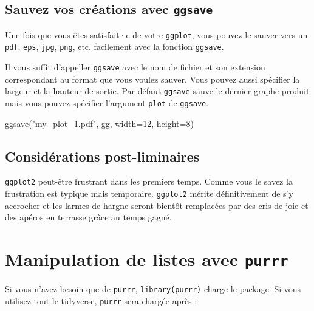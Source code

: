 \documentclass[
  letterpaper,
  DIV=11,
  numbers=noendperiod]{scrreprt}
\newenvironment{Shaded}{\begin{snugshade}}{\end{snugshade}}
\newcommand{\AttributeTok}[1]{\textcolor[rgb]{0.40,0.45,0.13}{#1}}
\newcommand{\DecValTok}[1]{\textcolor[rgb]{0.68,0.00,0.00}{#1}}
\newcommand{\FunctionTok}[1]{\textcolor[rgb]{0.28,0.35,0.67}{#1}}
\newcommand{\NormalTok}[1]{\textcolor[rgb]{0.00,0.23,0.31}{#1}}
\newcommand{\StringTok}[1]{\textcolor[rgb]{0.13,0.47,0.30}{#1}}
\begin{document}
\hypertarget{sauvez-vos-cruxe9ations-avec-ggsave}{%
\section{\texorpdfstring{Sauvez vos créations avec
\texttt{ggsave}}{Sauvez vos créations avec ggsave}}\label{sauvez-vos-cruxe9ations-avec-ggsave}}

Une fois que vous êtes satisfait·e de votre \texttt{ggplot}, vous pouvez
le sauver vers un \texttt{pdf}, \texttt{eps}, \texttt{jpg},
\texttt{png}, etc. facilement avec la fonction \texttt{ggsave}.

Il vous suffit d'appeller \texttt{ggsave} avec le nom de fichier et son
extension correspondant au format que vous voulez sauver. Vous pouvez
aussi spécifier la largeur et la hauteur de sortie. Par défaut
\texttt{ggsave} sauve le dernier graphe produit mais vous pouvez
spécifier l'argument \texttt{plot} de \texttt{ggsave}.

\begin{Shaded}
\begin{Highlighting}[]
\FunctionTok{ggsave}\NormalTok{(}\StringTok{"my\_plot\_1.pdf"}\NormalTok{, gg, }\AttributeTok{width=}\DecValTok{12}\NormalTok{, }\AttributeTok{height=}\DecValTok{8}\NormalTok{)}
\end{Highlighting}
\end{Shaded}

\hypertarget{considuxe9rations-post-liminaires}{%
\section{Considérations
post-liminaires}\label{considuxe9rations-post-liminaires}}

\texttt{ggplot2} peut-être frustrant dans les premiers temps. Comme vous
le savez la frustration est typique mais temporaire. \texttt{ggplot2}
mérite définitivement de s'y accrocher et les larmes de hargne seront
bientôt remplacées par des cris de joie et des apéros en terrasse grâce
au temps gagné.


\hypertarget{manipulation-de-listes-avec-purrr}{%
\chapter{\texorpdfstring{Manipulation de listes avec
\texttt{purrr}}{Manipulation de listes avec purrr}}\label{manipulation-de-listes-avec-purrr}}

Si vous n'avez besoin que de \texttt{purrr}, \texttt{library(purrr)}
charge le package. Si vous utilisez tout le tidyverse, \texttt{purrr}
sera chargée après :
\end{document}
